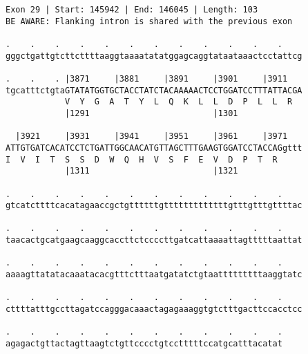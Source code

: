 \documentclass{article}
\begin{document}
\begin{Verbatim}
Exon 29 | Start: 145942 | End: 146045 | Length: 103
BE AWARE: Flanking intron is shared with the previous exon
 
.    .    .    .    .    .    .    .    .    .    .    .    
gggctgattgtcttcttttaaggtaaaatatatggagcaggtataataaactcctattcg
  
.    .    . |3871     |3881     |3891     |3901     |3911   
tgcatttctgtaGTATATGGTGCTACCTATCTACAAAAACTCCTGGATCCTTTATTACGA
            V  Y  G  A  T  Y  L  Q  K  L  L  D  P  L  L  R  
            |1291                         |1301             
  
  |3921     |3931     |3941     |3951     |3961     |3971   
ATTGTGATCACATCCTCTGATTGGCAACATGTTAGCTTTGAAGTGGATCCTACCAGgttt
I  V  I  T  S  S  D  W  Q  H  V  S  F  E  V  D  P  T  R     
            |1311                         |1321             
  
.    .    .    .    .    .    .    .    .    .    .    .    
gtcatcttttcacatagaaccgctgttttttgtttttttttttttgtttgtttgttttac
  
.    .    .    .    .    .    .    .    .    .    .    .    
taacactgcatgaagcaaggcaccttctccccttgatcattaaaattagtttttaattat
  
.    .    .    .    .    .    .    .    .    .    .    .    
aaaagttatatacaaatacacgtttctttaatgatatctgtaatttttttttaaggtatc
  
.    .    .    .    .    .    .    .    .    .    .    .    
cttttatttgccttagatccagggacaaactagagaaaggtgtctttgacttccacctcc
  
.    .    .    .    .    .    .    .    .    .    .    .
agagactgttactagttaagtctgttcccctgtcctttttccatgcatttacatat
\end{Verbatim}
\newpage
\end{document}
